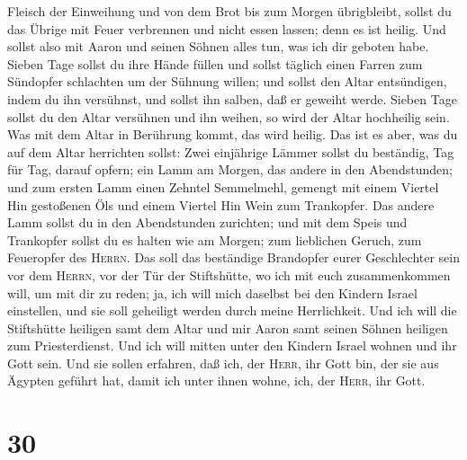 Fleisch der Einweihung und von dem Brot bis zum Morgen übrigbleibt,
sollst du das Übrige mit Feuer verbrennen und nicht essen lassen; denn
es ist heilig.  Und sollst also mit Aaron und seinen
Söhnen alles tun, was ich dir geboten habe. Sieben Tage sollst du ihre
Hände füllen  und sollst täglich einen Farren zum
Sündopfer schlachten um der Sühnung willen; und sollst den Altar
entsündigen, indem du ihn versühnst, und sollst ihn salben, daß er
geweiht werde.  Sieben Tage sollst du den Altar versühnen
und ihn weihen, so wird der Altar hochheilig sein. Was mit dem Altar in
Berührung kommt, das wird heilig.  Das ist es aber, was
du auf dem Altar herrichten sollst: Zwei einjährige Lämmer sollst du
beständig, Tag für Tag, darauf opfern;  ein Lamm am
Morgen, das andere in den Abendstunden;  und zum ersten
Lamm einen Zehntel Semmelmehl, gemengt mit einem Viertel Hin gestoßenen
Öls und einem Viertel Hin Wein zum Trankopfer.  Das
andere Lamm sollst du in den Abendstunden zurichten; und mit dem Speis
und Trankopfer sollst du es halten wie am Morgen; zum lieblichen Geruch,
zum Feueropfer des \textsc{Herrn}.  Das soll das
beständige Brandopfer eurer Geschlechter sein vor dem \textsc{Herrn},
vor der Tür der Stiftshütte, wo ich mit euch zusammenkommen will, um mit
dir zu reden;  ja, ich will mich daselbst bei den Kindern
Israel einstellen, und sie soll geheiligt werden durch meine
Herrlichkeit.  Und ich will die Stiftshütte heiligen samt
dem Altar und mir Aaron samt seinen Söhnen heiligen zum Priesterdienst.
 Und ich will mitten unter den Kindern Israel wohnen und
ihr Gott sein.  Und sie sollen erfahren, daß ich, der
\textsc{Herr}, ihr Gott bin, der sie aus Ägypten geführt hat, damit ich
unter ihnen wohne, ich, der \textsc{Herr}, ihr Gott.

\hypertarget{section-29}{%
\section{30}\label{section-29}}

